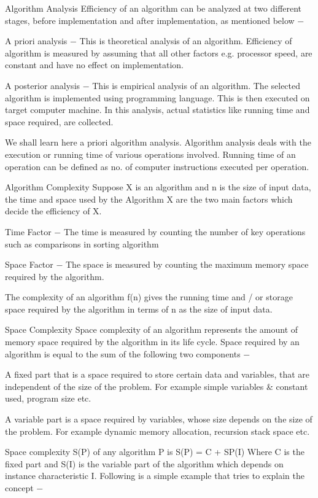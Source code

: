 \begin{frame}
Algorithm Analysis
Efficiency of an algorithm can be analyzed at two different stages, before implementation and after implementation, as mentioned below −

A priori analysis − This is theoretical analysis of an algorithm. Efficiency of algorithm is measured by assuming that all other factors e.g. processor speed, are constant and have no effect on implementation.

A posterior analysis − This is empirical analysis of an algorithm. The selected algorithm is implemented using programming language. This is then executed on target computer machine. In this analysis, actual statistics like running time and space required, are collected.

We shall learn here a priori algorithm analysis. Algorithm analysis deals with the execution or running time of various operations involved. Running time of an operation can be defined as no. of computer instructions executed per operation.
\end{frame}
\begin{frame}
Algorithm Complexity
Suppose X is an algorithm and n is the size of input data, the time and space used by the Algorithm X are the two main factors which decide the efficiency of X.

Time Factor − The time is measured by counting the number of key operations such as comparisons in sorting algorithm

Space Factor − The space is measured by counting the maximum memory space required by the algorithm.

The complexity of an algorithm f(n) gives the running time and / or storage space required by the algorithm in terms of n as the size of input data.
\end{frame}
\begin{frame}
Space Complexity
Space complexity of an algorithm represents the amount of memory space required by the algorithm in its life cycle. Space required by an algorithm is equal to the sum of the following two components −

A fixed part that is a space required to store certain data and variables, that are independent of the size of the problem. For example simple variables & constant used, program size etc.

A variable part is a space required by variables, whose size depends on the size of the problem. For example dynamic memory allocation, recursion stack space etc.

Space complexity S(P) of any algorithm P is S(P) = C + SP(I) Where C is the fixed part and S(I) is the variable part of the algorithm which depends on instance characteristic I. Following is a simple example that tries to explain the concept −
\end{frame}
